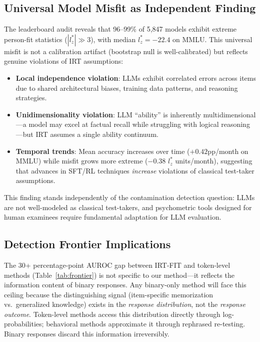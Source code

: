 \documentclass[11pt,a4paper]{article}
\begin{document}
\subsection{Universal Model Misfit as Independent Finding}

The leaderboard audit reveals that 96--99\% of 5{,}847 models exhibit extreme person-fit statistics ($|l_{z}^{*}| \gg 3$), with median $l_{z}^{*} = -22.4$ on MMLU.
This universal misfit is not a calibration artifact (bootstrap null is well-calibrated) but reflects genuine violations of IRT assumptions:

\begin{itemize}
\item \textbf{Local independence violation}: LLMs exhibit correlated errors across items due to shared architectural biases, training data patterns, and reasoning strategies.
\item \textbf{Unidimensionality violation}: LLM ``ability'' is inherently multidimensional---a model may excel at factual recall while struggling with logical reasoning---but IRT assumes a single ability continuum.
\item \textbf{Temporal trends}: Mean accuracy increases over time ($+0.42$pp/month on MMLU) while misfit grows more extreme ($-0.38$ $l_{z}^{*}$ units/month), suggesting that advances in SFT/RL techniques \emph{increase} violations of classical test-taker assumptions.
\end{itemize}

This finding stands independently of the contamination detection question: LLMs are not well-modeled as classical test-takers, and psychometric tools designed for human examinees require fundamental adaptation for LLM evaluation.

\subsection{Detection Frontier Implications}

The 30+ percentage-point AUROC gap between IRT-FIT and token-level methods (Table~\ref{tab:frontier}) is not specific to our method---it reflects the information content of binary responses.
Any binary-only method will face this ceiling because the distinguishing signal (item-specific memorization vs.\ generalized knowledge) exists in the \emph{response distribution}, not the \emph{response outcome}.
Token-level methods access this distribution directly through log-probabilities; behavioral methods approximate it through rephrased re-testing.
Binary responses discard this information irreversibly.
\end{document}
